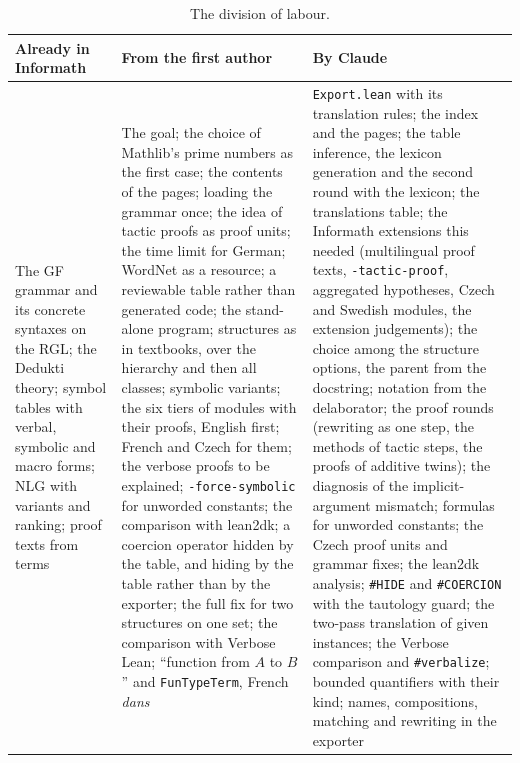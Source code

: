 \documentclass{easychair}
\newcommand{\ttt}[1]{\texttt{#1}}
\begin{document}
\begin{table}[t]
\centering\footnotesize
\begin{tabular}{p{}p{}p{}}
\toprule
\textbf{Already in Informath} & \textbf{From the first author} & \textbf{By Claude} \\
\midrule
The GF grammar and its concrete syntaxes on the RGL; the Dedukti theory; symbol tables with
verbal, symbolic and macro forms; NLG with variants and ranking; proof texts from terms &
The goal; the choice of Mathlib's prime numbers as the first case; the contents of the pages;
loading the grammar once; the idea of tactic proofs as proof units; the time limit for German;
WordNet as a resource; a reviewable table rather than generated code; the stand-alone program;
structures as in textbooks, over the hierarchy and then all classes; symbolic variants; the six
tiers of modules with their proofs, English first; French and Czech for them; the verbose proofs
to be explained; \ttt{-force-symbolic} for unworded constants; the comparison with lean2dk; a
coercion operator hidden by the table, and hiding by the table rather than by the exporter; the
full fix for two structures on one set; the comparison with Verbose Lean; ``function from $A$
to $B$'' and \ttt{FunTypeTerm}, French \emph{dans} &
\ttt{Export.lean} with its translation rules; the index and the pages; the table inference, the lexicon generation and the second round with the lexicon; the translations table; the Informath extensions this needed
(multilingual proof texts, \ttt{-tactic-proof}, aggregated hypotheses, Czech and Swedish
modules, the extension judgements); the choice among the structure options, the parent from
the docstring; notation from the delaborator; the proof rounds (rewriting as one step, the
methods of tactic steps, the proofs of additive twins); the diagnosis of the implicit-argument
mismatch; formulas for unworded constants; the Czech proof units and grammar fixes; the lean2dk
analysis; \ttt{\#HIDE} and \ttt{\#COERCION} with the tautology guard; the two-pass translation of
given instances; the Verbose comparison and \ttt{\#verbalize}; bounded quantifiers with their
kind; names, compositions, matching and rewriting in the exporter \\
\bottomrule
\end{tabular}
\caption{The division of labour.}
\label{tab:who}
\end{table}
\end{document}
